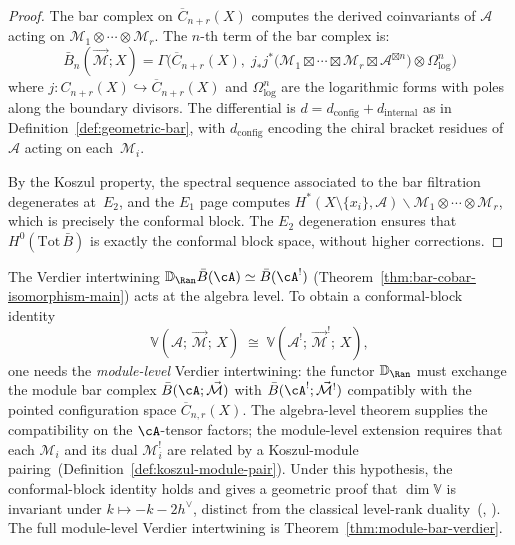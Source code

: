 \begin{proof}
The bar complex on $\overline{C}_{n+r}(X)$ computes the derived
coinvariants of $\mathcal{A}$ acting on
$\mathcal{M}_1 \otimes \cdots \otimes \mathcal{M}_r$.  The
$n$-th term of the bar complex is:
\[
\bar{B}_n(\vec{\mathcal{M}}; X) = \Gamma\bigl(
\overline{C}_{n+r}(X),\;
j_*j^*\bigl(\mathcal{M}_1 \boxtimes \cdots \boxtimes
\mathcal{M}_r \boxtimes \mathcal{A}^{\boxtimes n}\bigr)
\otimes \Omega^n_{\log}
\bigr)
\]
where $j\colon C_{n+r}(X) \hookrightarrow \overline{C}_{n+r}(X)$
and $\Omega^n_{\log}$ are the logarithmic forms with poles along
the boundary divisors.  The differential is
$d = d_{\mathrm{config}} + d_{\mathrm{internal}}$ as in
Definition~\ref{def:geometric-bar}, with $d_{\mathrm{config}}$
encoding the chiral bracket residues of $\mathcal{A}$ acting on
each~$\mathcal{M}_i$.

By the Koszul property, the spectral sequence associated to the
bar filtration degenerates at~$E_2$, and the $E_1$ page computes
$H^*(X \setminus \{x_i\}, \mathcal{A}) \backslash
\mathcal{M}_1 \otimes \cdots \otimes \mathcal{M}_r$, which is
precisely the conformal block.  The $E_2$ degeneration ensures that
$H^0(\mathrm{Tot}\, \bar{B})$ is exactly the conformal block
space, without higher corrections.
\end{proof}

\begin{remark}
\label{rem:conformal-blocks-koszul}
The Verdier intertwining
$\mathbb{D}_{\Ran}\bar{B}(\cA) \simeq \bar{B}(\cA^!)$
(Theorem~\ref{thm:bar-cobar-isomorphism-main}) acts at the
algebra level.  To obtain a conformal-block identity
\[
\mathbb{V}(\mathcal{A};\, \vec{\mathcal{M}};\, X)
\;\cong\;
\mathbb{V}(\mathcal{A}^!;\, \vec{\mathcal{M}}^!;\, X),
\]
one needs the \emph{module-level} Verdier intertwining: the functor
$\mathbb{D}_{\Ran}$ must exchange the module bar complex
$\bar{B}(\cA; \vec{\mathcal{M}})$ with
$\bar{B}(\cA^!; \vec{\mathcal{M}}^!)$ compatibly with the
pointed configuration space
$\overline{C}_{n,r}(X)$.  The algebra-level theorem
supplies the compatibility on the $\cA$-tensor factors; the
module-level extension requires that each $\mathcal{M}_i$ and its
dual $\mathcal{M}_i^!$ are related by a Koszul-module
pairing~(Definition~\ref{def:koszul-module-pair}).  Under
this hypothesis, the conformal-block identity holds and gives a
geometric proof that $\dim \mathbb{V}$ is invariant under
$k \mapsto -k - 2h^\vee$, distinct from the classical level-rank
duality~(\cite{Beauville}, \cite{NakanishiTsuchiya}).  The
full module-level Verdier intertwining is
Theorem~\ref{thm:module-bar-verdier}.
\end{remark}

